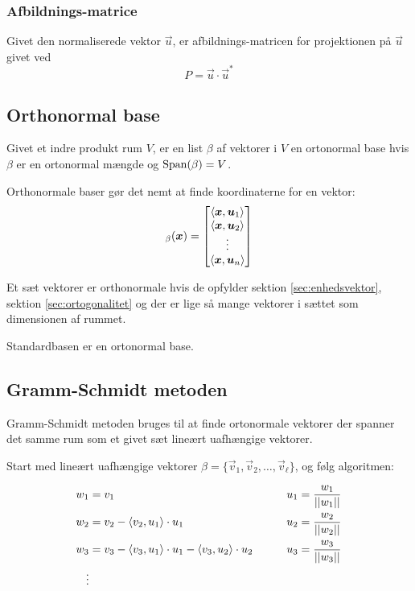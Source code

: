 \subsubsection{Afbildnings-matrice}
Givet den normaliserede vektor $\vec u$, er afbildnings-matricen for projektionen på $\vec u$ givet ved
\[
P = \vec u \cdot \vec u^*
\]

\subsection{Orthonormal base}
Givet et indre produkt rum $V$, er en list $\beta$ af vektorer i $V$ en ortonormal base hvis $\beta$ er en ortonormal mængde og $\operatorname{Span}(\beta) = V$.

Orthonormale baser gør det nemt at finde koordinaterne for en vektor:
\[
_\beta(\boldsymbol{x}) = \begin{bmatrix}
\left \langle \boldsymbol{x}, \boldsymbol{u}_1 \right \rangle \\
\left \langle \boldsymbol{x}, \boldsymbol{u}_2 \right \rangle \\
\vdots \\
\left \langle \boldsymbol{x}, \boldsymbol{u}_n \right \rangle
\end{bmatrix}
\]

Et sæt vektorer er orthonormale hvis de opfylder sektion \ref{sec:enhedsvektor}, sektion \ref{sec:ortogonalitet} og der er lige så mange vektorer i sættet som dimensionen af rummet.

Standardbasen er en ortonormal base.

\newpage

\subsection{Gramm-Schmidt metoden}
\label{sec:gramm-schmidt}
Gramm-Schmidt metoden bruges til at finde ortonormale vektorer der spanner det samme rum som et givet sæt lineært uafhængige vektorer.


Start med lineært uafhængige vektorer $\beta = \{\vec v_1, \vec v_2, \ldots, \vec v_\ell\}$, og følg algoritmen:

\begin{align*}
    w_1 &= v_1 \qquad 
    &u_1 &= \frac{w_1}{||w_1||} \\
    w_2 &= v_2 - \left \langle v_2, u_1 \right \rangle \cdot u_1 \qquad 
    &u_2 &= \frac{w_2}{||w_2||} \\
    w_3 &= v_3 - \left \langle v_3, u_1 \right \rangle \cdot u_1 - \left \langle v_3, u_2 \right \rangle \cdot u_2 \qquad 
    &u_3 &= \frac{w_3}{||w_3||} \\
    \vdots
\end{align*}

